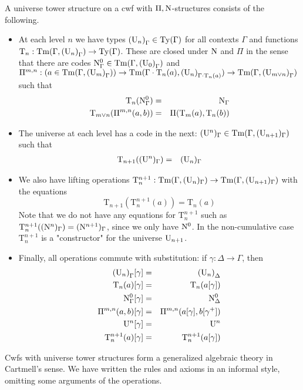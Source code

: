 \documentclass{lmcs}
\newcommand{\Ta}{\mathrm{T}}
\newcommand{\Tan}{\Ta_n}
\newcommand{\Un}{\U_n}
\begin{document}
A universe tower structure on a cwf with $\Pi, \mathrm{N}$-structures consists of the following.
\begin{itemize}
\item 
At each level $n$ we have types ${(\Un)}_\Gamma \in \Ty(\Gamma)$ for all contexts $\Gamma$ and functions $\Ta_n : \Tm(\Gamma,{(\U_n)}_\Gamma) \to \Ty(\Gamma)$. These are closed under $\mathrm{N}$ and $\Pi$ in the sense that there are codes $\mathrm{N}^0_\Gamma \in \mathrm{Tm}(\Gamma,{(\mathrm{U}_0)}_\Gamma)$ and $\Pi^{m,n} : (a \in \Tm(\Gamma,{(\U_m)}_\Gamma)) \to \Tm(\Gamma \cdot \Tan(a),{(\Un)}_{\Gamma \cdot \Tan(a)}
) \to \Tm(\Gamma,{(\U_{m\vee n})}_\Gamma)$ such that 
\begin{eqnarray*}
\Tan(\N^0_\Gamma) &=& \N_\Gamma\\
\Ta_{m \vee n}(\Pi^{m,n}(a,b)) &=& \Pi(\Ta_m(a),\Tan(b))
\end{eqnarray*}
\item
The universe at each level has a code in the next: $(\mathrm{U}^n)_\Gamma \in \mathrm{Tm}(\Gamma,(\mathrm{U}_{n+1})_\Gamma)$ such that 
\begin{eqnarray*}
\Ta_{n+1}((\U^n)_\Gamma ) &=& (\U_n)_\Gamma
\end{eqnarray*}
\item
We also have lifting operations
$\Ta_n^{n+1} : \Tm(\Gamma,(\U_n)_\Gamma) \to  \Tm(\Gamma,(\U_{n+1})_\Gamma)$
with the equations
$$
\Ta_{n+1}(\Ta_n^{n+1}(a)) = \Ta_n(a)
$$
Note that we do not have any equations for $\Ta_n^{n+1}$ such as
$\Ta^{n+1}_n((\N^n)_\Gamma) = (\N^{n+1})_\Gamma$, since we only have $\mathrm{N}^0$. In the non-cumulative case $\Ta_n^{n+1}$ is a "constructor" for the universe $\mathrm{U}_{n+1}$.
\item
Finally, all operations commute with substitution: if $\gamma : \Delta \to \Gamma$, then
\begin{eqnarray*}
{(\Un)}_\Gamma [ \gamma ] &=& {(\Un)}_\Delta\\
\Tan(a) [ \gamma ] &=& \Tan(a[ \gamma ] )\\
\N^0_\Gamma [ \gamma ] &=&\N^0_\Delta\\
\Pi^{m,n}(a,b)[ \gamma ] &=& \Pi^{m,n}(a [ \gamma ], b[ \gamma^+ ])\\
\U^n[\gamma] &=& \U^n\\
\Ta_n^{n+1}(a)[\gamma]  &=& \Ta_n^{n+1}(a[\gamma])
\end{eqnarray*}
\end{itemize}
Cwfs with universe tower structures form a generalized algebraic theory in Cartmell's sense. We have written the rules and axioms in an informal style, omitting some arguments of the operations.
\end{document}
